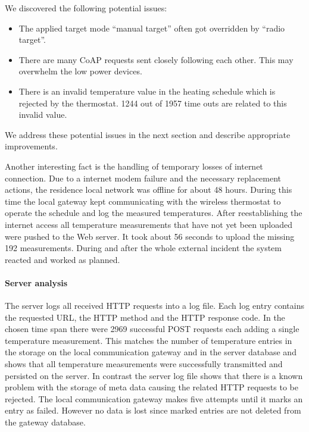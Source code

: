 We discovered the following potential issues:
\begin{itemize}
	\item The applied target mode ``manual target'' often got overridden by ``radio target''.
	\item There are many CoAP requests sent closely following each other. This may overwhelm the low power devices.
	\item There is an invalid temperature value in the heating schedule which is rejected by the thermostat. 1244 out of 1957 time outs are related to this invalid value.
\end{itemize}

We address these potential issues in the next section and describe appropriate improvements.

Another interesting fact is the handling of temporary losses of internet connection.
Due to a internet modem failure and the necessary replacement actions, the residence local network was offline for about 48 hours.
During this time the local gateway kept communicating with the wireless thermostat to operate the schedule and log the measured temperatures.
After reestablishing the internet access all temperature measurements that have not yet been uploaded were pushed to the Web server.
It took about 56 seconds to upload the missing 192 measurements.
During and after the whole external incident the system reacted and worked as planned.

\paragraph{Server analysis}


The server logs all received HTTP requests into a log file.
Each log entry contains the requested URL, the HTTP method and the HTTP response code.
In the chosen time span there were 2969 successful POST requests each adding a single temperature measurement.
This matches the number of temperature entries in the storage on the local communication gateway and in the server database and shows that all temperature measurements were successfully transmitted and persisted on the server.
In contrast the server log file shows that there is a known problem with the storage of meta data causing the related HTTP requests to be rejected.
The local communication gateway makes five attempts until it marks an entry as failed.
However no data is lost since marked entries are not deleted from the gateway database.



